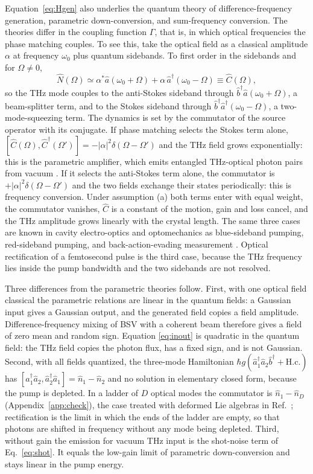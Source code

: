 \documentclass[aps,pra,reprint,superscriptaddress,amsmath,amssymb,floatfix]{revtex4-2}
\newcommand{\Nop}{\hat N}
\begin{document}
Equation~\eqref{eq:Hgen} also underlies the quantum theory of
difference-frequency generation, parametric down-conversion, and
sum-frequency conversion. The theories differ in the coupling function
$\Gamma$, that is, in which optical frequencies the phase matching couples.
To see this, take the optical
field as a classical amplitude $\alpha$ at frequency $\omega_0$ plus quantum
sidebands. To first order in the sidebands and for $\Omega\neq0$,
\begin{equation}
\Nop(\Omega)\simeq\alpha^*\hat a(\omega_0+\Omega)
+\alpha\,\hat a^\dagger(\omega_0-\Omega)\equiv\hat C(\Omega),
\label{eq:sidebands}
\end{equation}
so the THz mode couples to the anti-Stokes sideband through
$\hat b^\dagger\hat a(\omega_0+\Omega)$, a beam-splitter term, and to the
Stokes sideband through $\hat b^\dagger\hat a^\dagger(\omega_0-\Omega)$, a
two-mode-squeezing term. The dynamics is set by the commutator of the source
operator with its conjugate. If phase matching selects the Stokes term alone,
$[\hat C(\Omega),\hat C^\dagger(\Omega')]=-|\alpha|^2\delta(\Omega-\Omega')$
and the THz field grows exponentially: this is the parametric amplifier,
which emits entangled THz-optical photon pairs from vacuum
\cite{kutas2020}. If it selects the anti-Stokes term alone, the commutator is
$+|\alpha|^2\delta(\Omega-\Omega')$ and the two fields exchange their states
periodically: this is frequency conversion. Under assumption (a) both terms
enter with equal weight, the commutator vanishes, $\hat C$ is a constant of
the motion, gain and loss cancel, and the THz amplitude grows linearly with
the crystal length. The same three cases are known in cavity electro-optics
and optomechanics as blue-sideband pumping, red-sideband pumping, and
back-action-evading measurement \cite{tsang2010,tsang2011}. Optical
rectification of a femtosecond pulse is the third case, because the THz
frequency lies inside the pump bandwidth and the two sidebands are not
resolved.

Three differences from the parametric theories follow. First, with one
optical field classical the parametric relations are linear in the quantum
fields: a Gaussian input gives a Gaussian output, and the generated field
copies a field amplitude. Difference-frequency mixing of BSV with a coherent
beam therefore gives a field of zero mean and random sign. Equation
\eqref{eq:inout} is quadratic in the quantum field: the THz field copies the
photon flux, has a fixed sign, and is not Gaussian. Second, with all fields
quantized, the three-mode Hamiltonian
$\hbar g(\hat a_1^\dagger\hat a_2\hat b^\dagger+\mathrm{H.c.})$ has
$[\hat a_1^\dagger\hat a_2,\hat a_2^\dagger\hat a_1]=\hat n_1-\hat n_2$ and no
solution in elementary closed form, because the pump is depleted. In a ladder
of $D$ optical modes the commutator is $\hat n_1-\hat n_D$
(Appendix~\ref{app:check}), the case treated with deformed Lie algebras in
Ref.~\cite{miroshnichenko2017}; rectification is the limit in which the ends of
the ladder are empty, so that photons are shifted in frequency without any
mode being depleted. Third, without gain the emission for vacuum THz input is
the shot-noise term of Eq.~\eqref{eq:shot}. It equals the low-gain limit of
parametric down-conversion and stays linear in the pump energy.
\end{document}
